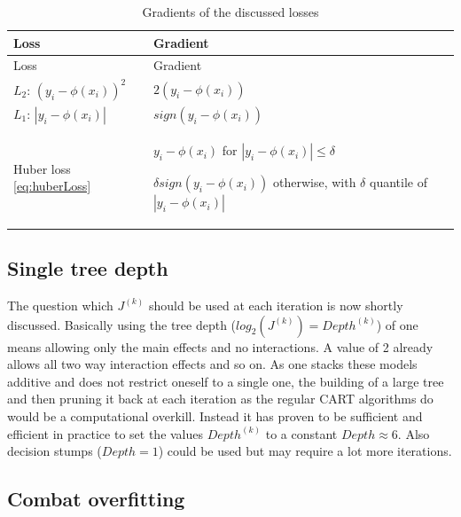 \documentclass[
]{book}
\begin{document}
\begin{longtable}[]{@{}
  >{\raggedright\arraybackslash}p{}
  >{\raggedright\arraybackslash}p{}@{}}
\caption{\label{tab:lossGradients} Gradients of the discussed losses \citep{elements}}\tabularnewline
\toprule
Loss & Gradient \\
\midrule
\endfirsthead
\toprule
Loss & Gradient \\
\midrule
\endhead
\(L_2\): \((y_i - \phi(x_i))^2\) & \(2(y_i - \phi(x_i))\) \\
\(L_1\): \(|y_i - \phi(x_i)|\) & \(sign(y_i - \phi(x_i))\) \\
Huber loss \eqref{eq:huberLoss} & \(y_i - \phi(x_i)\) for \(|y_i - \phi(x_i)| \leq \delta\)

\(\delta sign(y_i - \phi(x_i))\) otherwise, with \(\delta\) quantile of \(|y_i - \phi(x_i)|\) \\
\bottomrule
\end{longtable}

\hypertarget{single-tree-depth}{%
\subsection{Single tree depth}\label{single-tree-depth}}

The question which \(J^{(k)}\) should be used at each iteration is now shortly discussed. Basically using the tree depth (\(log_2(J^{(k)}) = Depth^{(k)}\)) of one means allowing only the main effects and no interactions. A value of 2 already allows all two way interaction effects and so on. As one stacks these models additive and does not restrict oneself to a single one, the building of a large tree and then pruning it back at each iteration as the regular CART algorithms do would be a computational overkill. Instead it has proven to be sufficient and efficient in practice to set the values \(Depth^{(k)}\) to a constant \(Depth \approx 6\).\citep{elements} Also decision stumps (\(Depth = 1\)) could be used but may require a lot more iterations.

\hypertarget{combOver}{%
\subsection{Combat overfitting}\label{combOver}}
\end{document}
